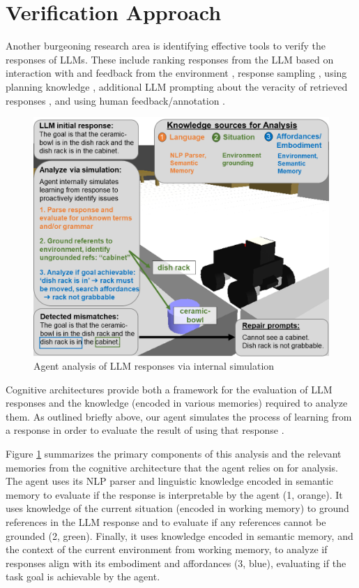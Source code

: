 \documentclass[letterpaper]{article} %
\begin{document}
\section{Verification Approach}

Another burgeoning research area is identifying effective tools to verify the responses of LLMs. These include ranking responses from the LLM based on interaction with and feedback from the environment \citet{logeswaran_few-shot_2022},  response sampling \cite{wang_self-consistency_2023}, using planning knowledge \cite{valmeekam_planning_2023}, additional LLM prompting about the veracity of retrieved responses \cite{kim_language_2023}, and using human feedback/annotation \cite{wu_tidybot_2023,kirk_improving_2022}.


\begin{figure}[t]
\centering
\includegraphics[width=1.0\columnwidth]{figures/AnalysisAndRepairVertical.png}
\caption{Agent analysis of LLM responses via internal simulation}
\label{fig:analysis}
\end{figure}

Cognitive architectures provide both a framework for the evaluation of LLM responses and the knowledge (encoded in various memories) required to analyze them. As outlined briefly above, our agent simulates the process of learning from a response in order to evaluate the result of using that response \cite{kirk_improving_2023}.

Figure \ref{fig:analysis} summarizes the primary components of this analysis and the relevant memories from the cognitive architecture that the agent relies on for analysis. The agent uses its NLP parser and linguistic knowledge encoded in semantic memory to evaluate if the response is interpretable by the agent (1, orange). It uses knowledge of the current situation (encoded in working memory) to ground references in the LLM response and to evaluate if any references cannot be grounded (2, green). Finally, it uses knowledge encoded in semantic memory, and the context of the current environment from working memory, to analyze if responses align with its embodiment and affordances (3, blue), evaluating if the task goal is achievable by the agent.
\end{document}
